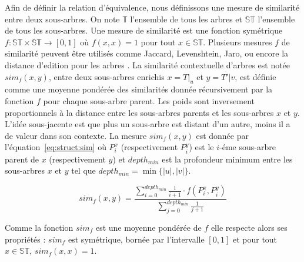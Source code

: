 Afin de définir la relation d'équivalence, nous définissons une mesure de similarité entre deux sous-arbres.
On note $\mathbb{T}$ l'ensemble de tous les arbres et $\mathbb{ST}$ l'ensemble de tous les sous-arbres.
Une mesure de similarité est une fonction symétrique $f : \mathbb{ST} \times \mathbb{ST} \to [0,1]$ où $f(x, x) = 1$ pour tout $x \in \mathbb{ST}$.
Plusieurs mesures $f$ de similarité peuvent être utilisés comme Jaccard, Levenshtein, Jaro, ou encore la distance d'edition pour les arbres \cite{zhangSimpleFastAlgorithms1989}.
La similarité contextuelle d'arbres est notée $sim_f(x, y)$, entre deux sous-arbres enrichis $x = T|_u$ et $y = T'|v$, est définie comme une moyenne pondérée des similarités donnée récursivement par la fonction $f$ pour chaque sous-arbre parent.
Les poids sont inversement proportionnels à la distance entre les sous-arbres parents et les sous-arbres $x$ et $y$.
L'idée sous-jacente est que plus un sous-arbre est distant d'un autre, moins il a de valeur dans son contexte.
La mesure $sim_f(x, y)$ est donnée par l'équation~\ref{eq:struct:sim} où $P^x_i$ (respectivement $P^y_i$) est le $i$-éme sous-arbre parent de $x$ (respectivement $y$) et $depth_{min}$ est la profondeur minimum entre les sous-arbres $x$ et $y$ tel que $depth_{min} = \min\{|u|, |v|\}$.

\begin{equation}
    sim_f(x, y) = \frac{\sum_{i=0}^{depth_{min}} \frac{1}{i + 1} \cdot f(P^x_i, P^y_i)}{\sum_{j=0}^{depth_{min}} \frac{1}{j + 1}} \label{eq:struct:sim}
\end{equation}

\begin{axiom}
    Comme la fonction $sim_f$ est une moyenne pondérée de $f$ elle respecte alors ses propriétés :
    $sim_f$ est symétrique, bornée par l'intervalle $[0, 1]$ et pour tout $x \in \mathbb{ST}$, $sim_f(x, x) = 1$.
\end{axiom}


